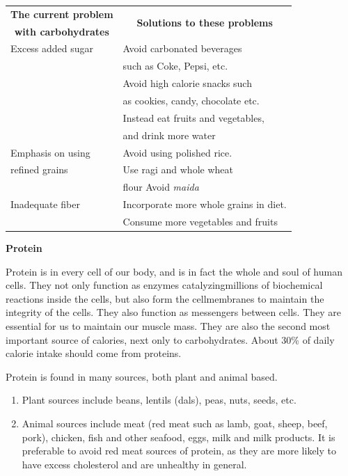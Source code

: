 \begin{center}
\begin{tabular}{|l|l|}
\hline
\textbf{The current problem} & \multicolumn{1}{c|}{\multirow{2}{5cm}{\textbf{Solutions to these problems}}}\\
\multicolumn{1}{|c|}{\textbf{with carbohydrates}} &\\
\hline
Excess added sugar & Avoid carbonated beverages\\
 & such as Coke, Pepsi, etc.\\
 & Avoid high calorie snacks such\\
 & as cookies, candy, chocolate etc.\\
 & Instead eat fruits and vegetables,\\
 & and drink more water\\
\hline
Emphasis on using & Avoid using polished rice.\\
refined grains & Use ragi and whole wheat\\
 & flour Avoid \textit{maida}\\
\hline
Inadequate fiber & Incorporate more whole grains in diet.\\
 & Consume more vegetables and fruits\\
\hline
\end{tabular}
\end{center}

\noindent\textbf{Protein}

Protein is in every cell of our body, and is in fact the whole and soul of human cells. They not only function as enzymes catalyzing\break millions of biochemical reactions inside the cells, but also form the cell\break membranes to maintain the integrity of the cells. They also function as messengers between cells. They are essential for us to maintain our muscle mass. They are also the second most important source of calories, next only to carbohydrates. About 30\% of daily calorie intake should come from proteins.

\noindent Protein is found in many sources, both plant and animal based.

\begin{enumerate}[\ding{118}]
\itemsep=0pt
\item Plant sources include beans, lentils (dals), peas, nuts, seeds, etc.
\item Animal sources include meat (red meat such as lamb, goat, sheep, beef, pork), chicken, fish and other seafood, eggs, milk and milk products. It is preferable to avoid red meat sources of protein, as they are more likely to have excess cholesterol and are unhealthy in general.
\end{enumerate}

